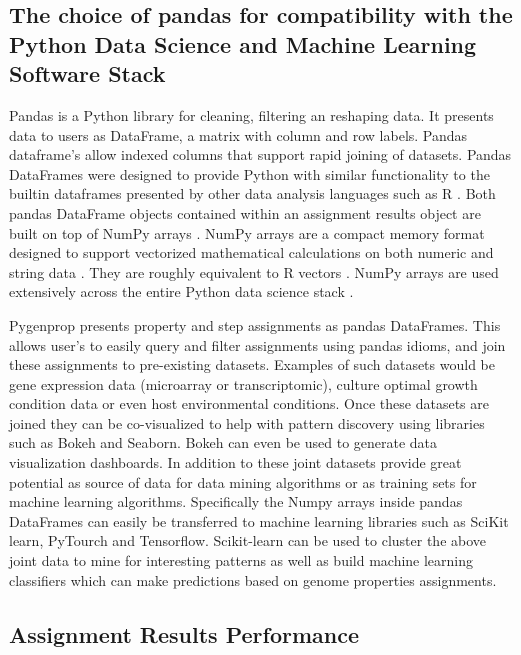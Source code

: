\subsubsection{}



\subsection{The choice of pandas for compatibility with the Python Data Science and Machine Learning Software Stack}

Pandas is a Python library for cleaning, filtering an reshaping data. It presents data to users as DataFrame, a matrix with column and row labels. Pandas dataframe's allow indexed columns that support rapid joining of datasets. Pandas DataFrames were designed to provide Python with similar functionality to the builtin dataframes presented by other data analysis languages such as R \cite{rprogman}. Both pandas DataFrame objects contained within an assignment results object are built on top of NumPy arrays \cite{mckinney2010data}. NumPy arrays are a compact memory format designed to support vectorized mathematical calculations on both numeric and string data \cite{van2011numpy}. They are roughly equivalent to R vectors \cite{rprogman}. NumPy arrays are used extensively across the entire Python data science stack \cite{scipystack}. 

Pygenprop presents property and step assignments as pandas DataFrames. This allows user's to easily query and filter assignments using pandas idioms, and join these assignments to pre-existing datasets. Examples of such datasets would be gene expression data (microarray or transcriptomic), culture optimal growth condition data or even host environmental conditions. Once these datasets are joined they can be co-visualized to help with pattern discovery using libraries such as Bokeh and Seaborn. Bokeh can even be used to generate data visualization dashboards. In addition to these joint datasets provide great potential as source of data for data mining algorithms or as training sets for machine learning algorithms. Specifically the Numpy arrays inside pandas DataFrames can easily be transferred to machine learning libraries such as SciKit learn, PyTourch and Tensorflow. Scikit-learn can be used to cluster the above joint data to mine for interesting patterns as well as build machine learning classifiers which can make predictions based on genome properties assignments.

\subsection{Assignment Results Performance}
